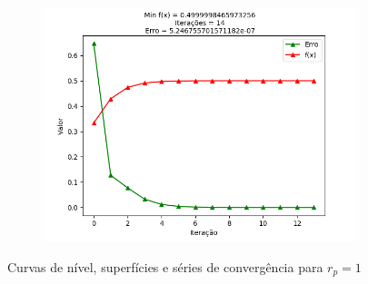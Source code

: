 \documentclass[a4paper, 12pt]{article}
\begin{document}
\begin{figure}[H]
\begin{subfigure}{0.3\textwidth}
  \includegraphics[width=\linewidth]{1/A/RP1/convergencia.png}
\end{subfigure}
\caption{Curvas de nível, superfícies e séries de convergência para $r_p = 1$}
\label{fig:Q1ARP1}
\end{figure}
\end{document}
